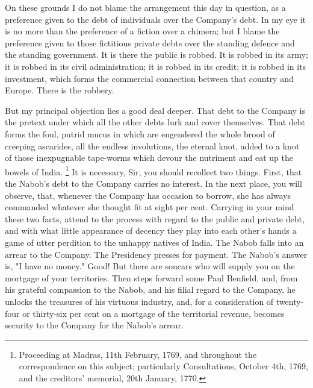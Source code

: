 On these grounds I do not blame the arrangement this day in question, as a preference given to the debt of individuals over the Company's debt. In my eye it is no more than the preference of a fiction over a chimera; but I blame the preference given to those fictitious private debts over the standing defence and the standing government. It is there the public is robbed. It is robbed in its army; it is robbed in its civil administration; it is robbed in its credit; it is robbed in its investment, which forms the commercial connection between that country and Europe. There is the robbery.

But my principal objection lies a good deal deeper. That debt to the Company is the pretext under which all the other debts lurk and cover themselves. That debt forms the foul, putrid mucus in which are engendered the whole brood of creeping ascarides, all the endless involutions, the eternal knot, added to a knot of those inexpugnable tape-worms which devour the nutriment and eat up the bowels of India.
\footnote{ Proceeding at Madras, 11th February, 1769, and throughout the correspondence on this subject; particularly Consultations, October 4th, 1769, and the creditors' memorial, 20th January, 1770.}
 It is necessary, Sir, you should recollect two things. First, that the Nabob's debt to the Company carries no interest. In the next place, you will observe, that, whenever the Company has occasion to borrow, she has always commanded whatever she thought fit at eight per cent. Carrying in your mind these two facts, attend to the process with regard to the public and private debt, and with what little appearance of decency they play into each other's hands a game of utter perdition to the unhappy natives of India. The Nabob falls into an arrear to the Company. The Presidency presses for payment. The Nabob's answer is, "I have no money." Good! But there are soucars who will supply you on the mortgage of your territories. Then steps forward some Paul Benfield, and, from his grateful compassion to the Nabob, and his filial regard to the Company, he unlocks the treasures of his virtuous industry, and, for a consideration of twenty-four or thirty-six per cent on a mortgage of the territorial revenue, becomes security to the Company for the Nabob's arrear.

